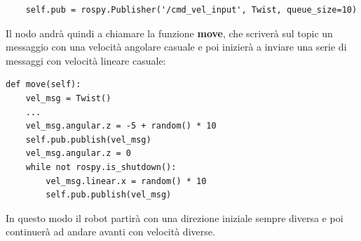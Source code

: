 \documentclass[Lau, binding=0.6cm, oneside]{sapthesis}
\begin{document}
\begin{lstlisting}
	self.pub = rospy.Publisher('/cmd_vel_input', Twist, queue_size=10)
\end{lstlisting}

Il nodo andrà quindi a chiamare la funzione \textbf{move}, che scriverà sul topic un messaggio con una velocità angolare casuale e poi inizierà a inviare una serie di messaggi con velocità lineare casuale:

\begin{lstlisting}
def move(self):
    vel_msg = Twist()
    ...
    vel_msg.angular.z = -5 + random() * 10
    self.pub.publish(vel_msg)
    vel_msg.angular.z = 0
    while not rospy.is_shutdown():
        vel_msg.linear.x = random() * 10
        self.pub.publish(vel_msg)
\end{lstlisting}
In questo modo il robot partirà con una direzione iniziale sempre diversa e poi continuerà ad andare avanti con velocità diverse.
\end{document}
